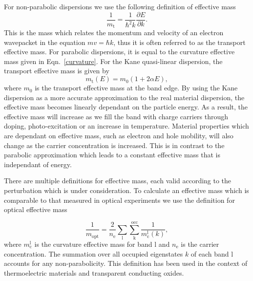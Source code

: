 For non-parabolic dispersions we use the following definition of effective mass
\begin{equation} \label{transport}
\frac{1}{m_\text{t}} = \frac{1}{\hbar^2 k}\frac{\partial E}{\partial k}.
\end{equation}
This is the mass which relates the momentum and velocity of an electron wavepacket in the equation $mv = \hbar k$,\autocite{Ariel2012b} thus it is often referred to as the transport effective mass.
For parabolic dispersions, it is equal to the curvature effective mass given in Eqn.\ \ref{curvature}. 
For the Kane quasi-linear dispersion, the transport effective mass is given by
\begin{equation} \label{kanemass}
m_\text{t}(E) = m_0(1+2 \alpha E),
\end{equation}
where $m_{0}$ is the transport effective mass at the band edge.\autocite{Segev2005} 
By using the Kane dispersion as a more accurate approximation to the real material dispersion, the effective mass becomes linearly dependant on the particle energy.
As a result, the effective mass will increase as we fill the band with charge carriers through doping, photo-excitation or an increase in temperature.\autocite{Riffe2002}
Material properties which are dependant on effective mass, such as electron and hole mobility, will also change as the carrier concentration is increased.
This is in contrast to the parabolic approximation which leads to a constant effective mass that is independant of energy.

There are multiple definitions for effective mass, each valid according to the perturbation which is under consideration.
To calculate an effective mass which is comparable to that measured in optical experiments we use the definition for optical effective mass

\begin{equation}
\frac{1}{m_{\text{opt}}} = \frac{2}{n_{\text{e}}}\sum_{\text{l}}\sum_{\text{k}}^{\text{occ}} \frac{1}{m_\text{c}^{\text{l}}(k)},
\end{equation}
where $m_{\text{c}}^{\text{l}}$ is the curvature effective mass for band $\text{l}$ and $n_{\text{e}}$ is the carrier concentration. 
The summation over all occupied eigenstates $k$ of each band l accounts for any non-parabolicity. 
This definition has been used in the context of thermoelectric materials\autocite{Gibbs2017} and transparent conducting oxides.\autocite{Hautier2013} 

